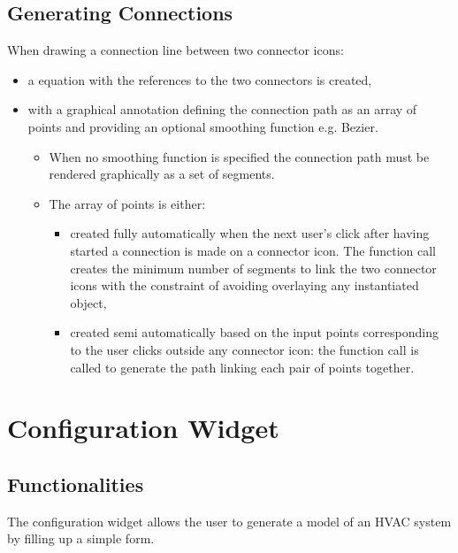 \documentclass[letterpaper,10pt, openany,english]{sphinxmanual}
\begin{document}
\subsection{Generating Connections}
\label{\detokenize{requirements:generating-connections}}
When drawing a connection line between two connector icons:
\begin{itemize}
\item {} 
a  equation with the references to the two connectors is created,

\item {} 
with a graphical annotation defining the connection path as an array of points and providing an optional smoothing function e.g. Bezier.
\begin{itemize}
\item {} 
When no smoothing function is specified the connection path must be rendered graphically as a set of segments.

\item {} 
The array of points is either:
\begin{itemize}
\item {} 
created fully automatically when the next user’s click after having started a connection is made on a connector icon. The function call  creates the minimum number of  segments to link the two connector icons with the constraint of avoiding overlaying any instantiated object,

\item {} 
created semi automatically based on the input points corresponding to the user clicks outside any connector icon: the function call  is called to generate the path linking each pair of points together.

\end{itemize}

\end{itemize}

\end{itemize}


\section{Configuration Widget}
\label{\detokenize{requirements:configuration-widget}}

\subsection{Functionalities}
\label{\detokenize{requirements:id4}}
The configuration widget allows the user to generate a model of an HVAC system by filling up a simple form.
\end{document}
